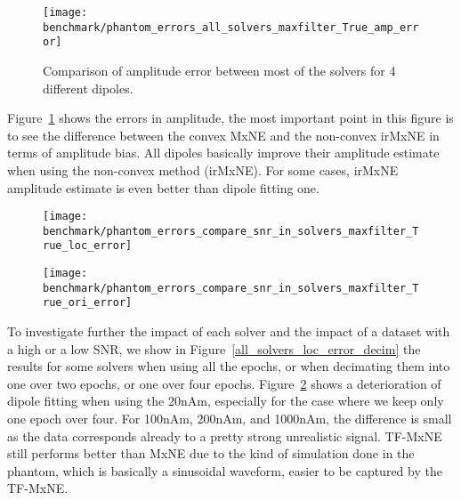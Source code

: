 \begin{figure}
	\texttt{[image: benchmark/phantom\_errors\_all\_solvers\_maxfilter\_True\_amp\_error]}
	\caption{Comparison of amplitude error between most of the solvers for 4 different dipoles.\label{all_solvers_amp_error}}
\end{figure}

Figure~\ref{all_solvers_amp_error} shows the errors in amplitude, the most important point in this figure is to see the difference between the convex MxNE and the non-convex irMxNE in terms of amplitude bias. All dipoles basically improve their amplitude estimate when using the non-convex method (irMxNE). For some cases, irMxNE amplitude estimate is even better than dipole fitting one.

\begin{sidewaysfigure}[ht]
        \centering
        \begin{subfigure}[b]{0.47\textwidth}
            \centering
            \texttt{[image: benchmark/phantom\_errors\_compare\_snr\_in\_solvers\_maxfilter\_True\_loc\_error]}
            \caption{\label{fig:all_solvers_loc_error_decim}}
        \end{subfigure}
		\hspace{25pt}
        \begin{subfigure}[b]{0.47\textwidth}  
            \centering 
            \texttt{[image: benchmark/phantom\_errors\_compare\_snr\_in\_solvers\_maxfilter\_True\_ori\_error]}
            \caption{\label{fig:all_solvers_ori_error_decim}}
        \end{subfigure}

		\caption{Comparison of the position and the orientation error between come solvers when taking only part of the epochs to reduce the SNR..\label{all_solvers_loc_error_decim}}
\end{sidewaysfigure}

To investigate further the impact of each solver and the impact of a dataset with a high or a low SNR, we show in Figure~\ref{all_solvers_loc_error_decim} the results for some solvers when using all the epochs, or when decimating them into one over two epochs, or one over four epochs. Figure~\ref{fig:all_solvers_loc_error_decim} shows a deterioration of dipole fitting when using the 20nAm, especially for the case where we keep only one epoch over four. For 100nAm, 200nAm, and 1000nAm, the difference is small as the data corresponds already to a pretty strong unrealistic signal. TF-MxNE still performs better than MxNE due to the kind of simulation done in the phantom, which is basically a sinusoidal waveform, easier to be captured by the TF-MxNE.

